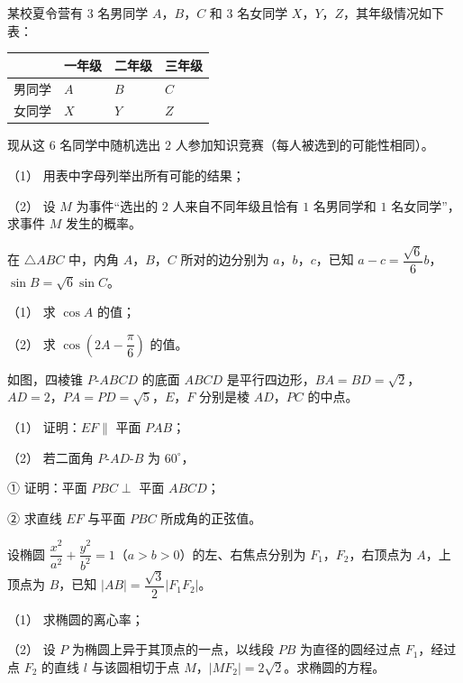 \begin{question}
某校夏令营有 $3$ 名男同学 $A$，$B$，$C$ 和 $3$ 名女同学 $X$，$Y$，$Z$，其年级情况如下表：

\begin{center}
\begin{tabular}{llll}
\toprule
 & 一年级 & 二年级 & 三年级 \\
\midrule
男同学 & $A$ & $B$ & $C$ \\
女同学 & $X$ & $Y$ & $Z$ \\
\bottomrule
\end{tabular}
\end{center}

现从这 $6$ 名同学中随机选出 $2$ 人参加知识竞赛（每人被选到的可能性相同）。

（1） 用表中字母列举出所有可能的结果；

（2） 设 $M$ 为事件“选出的 $2$ 人来自不同年级且恰有 $1$ 名男同学和 $1$ 名女同学”，求事件 $M$ 发生的概率。

\end{question}
\begin{question}
在 $\triangle ABC$ 中，内角 $A$，$B$，$C$ 所对的边分别为 $a$，$b$，$c$，已知 $a-c=\dfrac{\sqrt6}{6}b$，$\sin B=\sqrt6\sin C$。

（1） 求 $\cos A$ 的值；

（2） 求 $\cos\left(2A-\dfrac\pi6\right)$ 的值。

\Needspace{0.4\textheight}
\end{question}
\begin{question}
如图，四棱锥 $P\text{-}ABCD$ 的底面 $ABCD$ 是平行四边形，$BA=BD=\sqrt2$，$AD=2$，$PA=PD=\sqrt5$，$E$，$F$ 分别是棱 $AD$，$PC$ 的中点。
\nopagebreak[4]
\begin{center}\end{center}
\nopagebreak[4]
（1） 证明：$EF\parallel$ 平面 $PAB$；

（2） 若二面角 $P\text{-}AD\text{-}B$ 为 $60^\circ$，

① 证明：平面 $PBC\perp$ 平面 $ABCD$；

② 求直线 $EF$ 与平面 $PBC$ 所成角的正弦值。

\end{question}
\begin{question}
设椭圆 $\dfrac{x^2}{a^2}+\dfrac{y^2}{b^2}=1$（$a>b>0$）的左、右焦点分别为 $F_1$，$F_2$，右顶点为 $A$，上顶点为 $B$，已知 $|AB|=\dfrac{\sqrt3}{2}|F_1F_2|$。

（1） 求椭圆的离心率；

（2） 设 $P$ 为椭圆上异于其顶点的一点，以线段 $PB$ 为直径的圆经过点 $F_1$，经过点 $F_2$ 的直线 $l$ 与该圆相切于点 $M$，$|MF_2|=2\sqrt2$。求椭圆的方程。

\end{question}
